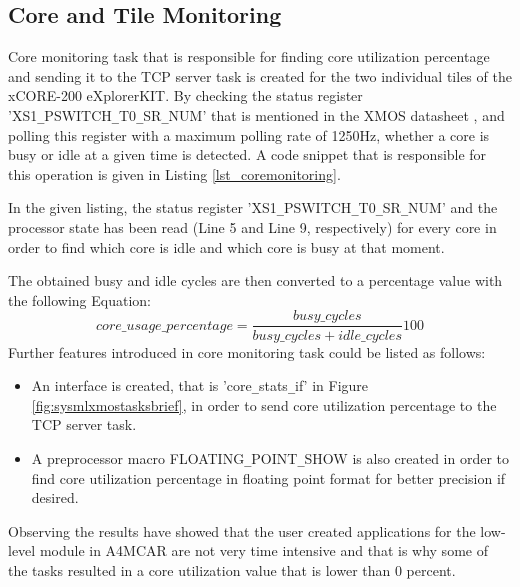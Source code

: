 \subsection{Core and Tile Monitoring}\label{coremonitoringsection}
Core monitoring task that is responsible for finding core utilization percentage and sending it to the TCP server task is created for the two individual tiles of the xCORE-200 eXplorerKIT. By checking the status register 'XS1\texttt{\_}PSWITCH\texttt{\_}T0\texttt{\_}SR\texttt{\_}NUM' that is mentioned in the XMOS datasheet \cite{xmosdatasheet}, and polling this register with a maximum polling rate of 1250Hz, whether a core is busy or idle at a given time is detected. A code snippet that is responsible for this operation is given in Listing \ref{lst_coremonitoring}. 



In the given listing, the status register 'XS1\texttt{\_}PSWITCH\texttt{\_}T0\texttt{\_}SR\texttt{\_}NUM' and the processor state has been read (Line 5 and Line 9, respectively) for every core in order to find which core is idle and which core is busy at that moment. 

The obtained busy and idle cycles are then converted to a percentage value with the following Equation:
\begin{equation}
core\texttt{\_}usage\texttt{\_}percentage=\frac{busy\texttt{\_}cycles}{busy\texttt{\_}cycles + idle\texttt{\_}cycles} 100
\end{equation}
Further features introduced in core monitoring task could be listed as follows:
\begin{itemize}
	\item An interface is created, that is 'core\texttt{\_}stats\texttt{\_}if' in Figure \ref{fig:sysmlxmostasksbrief}, in order to send core utilization percentage to the TCP server task. 
	\item A preprocessor macro FLOATING\texttt{\_}POINT\texttt{\_}SHOW is also created in order to find core utilization percentage in floating point format for better precision if desired.
\end{itemize}

Observing the results have showed that the user created applications for the low-level module in A4MCAR are not very time intensive and that is why some of the tasks resulted in a core utilization value that is lower than 0 percent.

